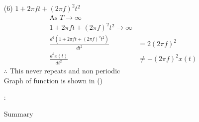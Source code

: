 \documentclass[journal,12pt,onecolumn]{IEEEtran}
\theoremstyle{remark}
\begin{document}
\begin{enumerate}
 \item[(6)] $1+2\pi f t+(2\pi f)^2t^2$\\

 \begin{align}
  \text{As } T\to\infty\\
  1+2\pi f t+(2\pi f)^2t^2  \to \infty\\
   \frac{d^2(1+2\pi f t+(2\pi f)^2t^2)}{dt^2}&=2(2\pi f)^2\\
   \frac{d^2 x(t)}{dt^2} &\neq - (2\pi f)^2 x(t)
 \end{align}
  $\therefore$ This never repeats and non periodic\\ 
 Graph of function is shown in ()
 \begin{flushleft}
  \begin{table}[h]
   \def\arraystretch{1.5}:
   \caption{Summary}
   
  \end{table}
 \end{flushleft}
 
\end{enumerate}
 \renewcommand{\thefigure}{\theenumi}
 \renewcommand{\thetable}{\theenumi}
 
\end{document}
